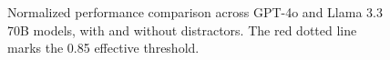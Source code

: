 \begin{figure}[b!]
    \centering
    \caption{Normalized performance comparison across GPT-4o and Llama 3.3 70B models, with and without distractors. The red dotted line marks the 0.85 effective threshold.}
    \label{fig:distractors}
\end{figure}